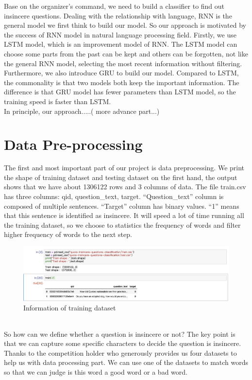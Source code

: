 \documentclass{article}
\begin{document}
\noindent Base on the organizer's command, we need to build a classifier to find out insincere questions. Dealing with the relationship with language, RNN is the general model we first think  to build our model. So our approach is motivated by the success of RNN model in natural language processing field. Firstly, we  use LSTM model, which is an improvement model of RNN. The LSTM model can choose some parts from the past can be kept and others can be forgotten, not like the general RNN model, selecting the most recent information without filtering. Furthermore, we also introduce GRU to build our model. Compared to LSTM, the commonality is that two models both keep the important information. The difference is that GRU model has fewer parameters than LSTM model, so the training speed is faster than LSTM.\\

\noindent In principle, our approach.....( more advance part...)
\section{ Data Pre-processing}
\noindent The first and most important part of our project is data preprocessing.  We print the shape of training dataset and testing dataset on the first hand, the output shows that we have about 1306122 rows and 3 columns of data. The file train.csv has three columns: qid, question\_text, target. “Question\_text” column is composed of multiple sentences. “Target” column has binary values. “1” means that this sentence is identified as insincere. It will speed a lot of time running all the training dataset, so we choose to statistics the frequency of words and filter higher frequency of words to the next step.\\
\begin{figure}[h]
	\centering
	\includegraphics[scale = 0.15]{n1.jpeg}
	\caption{Information of training dataset
		}
\end{figure}\\
\noindent So how can we define whether a question is insincere or not? The key point is that we can capture some specific characters to decide the question is insincere. Thanks to the competition holder who generously provides us four datasets to help us with data processing part. We can use one of the datasets to match words so that we can judge is this word a good word or a bad word.\\
\end{document}

